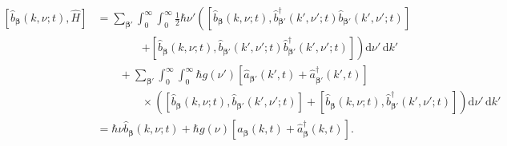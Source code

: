 \begin{equation}
\begin{split}
\left[\hat{b}_{\bm{\beta}}(k,\nu;t),\hat{H}\right] &= \sum_{\bm{\beta}'}\int_0^\infty\int_0^\infty\frac{1}{2}\hbar\nu'\left(\left[\hat{b}_{\bm{\beta}}(k,\nu;t),\hat{b}_{\bm{\beta}'}^\dagger(k',\nu';t)\hat{b}_{\bm{\beta}'}(k',\nu';t)\right]\right.\\
&\qquad\qquad\left. + \left[\hat{b}_{\bm{\beta}}(k,\nu;t),\hat{b}_{\bm{\beta}'}(k',\nu';t)\hat{b}_{\bm{\beta}'}^\dagger(k',\nu';t)\right]\right)\mathrm{d}\nu'\,\mathrm{d}k'\\
&\qquad + \sum_{\bm{\beta}'}\int_0^\infty\int_0^\infty \hbar g(\nu')\left[\hat{a}_{\bm{\beta}'}(k',t) + \hat{a}_{\bm{\beta}'}^\dagger(k',t)\right]\\
&\qquad\qquad\times\left(\left[\hat{b}_{\bm{\beta}}(k,\nu;t),\hat{b}_{\bm{\beta}'}(k',\nu';t)\right] + \left[\hat{b}_{\bm{\beta}}(k,\nu;t),\hat{b}_{\bm{\beta}'}^\dagger(k',\nu';t)\right]\right)\mathrm{d}\nu'\,\mathrm{d}k'\\[1.0em]
&= \hbar\nu\hat{b}_{\bm{\beta}}(k,\nu;t) + \hbar g(\nu)\left[\hat{a}_{\bm{\beta}}(k,t) + \hat{a}_{\bm{\beta}}^\dagger(k,t)\right].
\end{split}
\end{equation}
